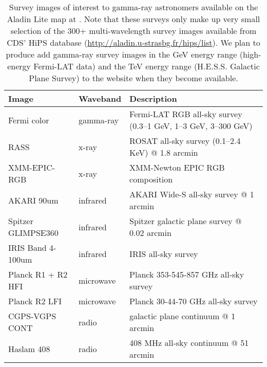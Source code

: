 \begin{table}[bt]

\caption{
Survey images of interest to gamma-ray astronomers available on the Aladin Lite map at \gammasky . Note that these surveys only make up very small selection of the 300+ multi-wavelength survey images available from CDS' HiPS database (\protect\url{http://aladin.u-strasbg.fr/hips/list}). We plan to produce add gamma-ray survey images in the GeV energy range (high-energy Fermi-LAT data) and the TeV energy range (H.E.S.S. Galactic Plane Survey) to the website when they become available.
}

\label{tab:images}
\begin{tabular}{ lll }
\hline
Image              & Waveband  & Description\\
\hline
Fermi color        & gamma-ray & Fermi-LAT RGB all-sky survey (0.3--1 GeV, 1--3 GeV, 3--300 GeV) \\
RASS               & x-ray & ROSAT all-sky survey (0.1--2.4 KeV) @ 1.8 arcmin\\
XMM-EPIC-RGB       & x-ray & XMM-Newton EPIC RGB composition\\
AKARI 90um         & infrared  & AKARI Wide-S all-sky survey @ 1 arcmin\\
Spitzer GLIMPSE360 & infrared  & Spitzer galactic plane survey @ 0.02 arcmin\\
IRIS Band 4-100um  & infrared  & IRIS all-sky survey\\
Planck R1 + R2 HFI & microwave & Planck 353-545-857 GHz all-sky survey\\
Planck R2 LFI      & microwave & Planck 30-44-70 GHz all-sky survey\\
CGPS-VGPS CONT     & radio     & galactic plane continuum @ 1 arcmin\\
Haslam 408         & radio     & 408 MHz all-sky continuum @ 51 arcmin\\
\hline
\end{tabular}

\end{table}
